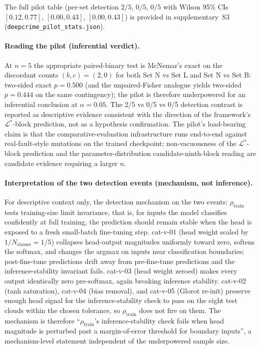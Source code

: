 \documentclass[manuscript]{acmart}
\begin{document}
The full pilot table (per-set detection $2/5$, $0/5$, $0/5$ with Wilson 95\% CIs $[0.12,0.77]$, $[0.00,0.43]$, $[0.00,0.43]$) is provided in supplementary~S3 (\texttt{deepcrime\_pilot\_stats.json}).

\paragraph{Reading the pilot (inferential verdict).}
At $n=5$ the appropriate paired-binary test is McNemar's exact on the discordant counts $(b, c) = (2, 0)$ for both Set N vs Set L and Set N vs Set B: two-sided exact $p = 0.500$ (and the unpaired-Fisher analogue yields two-sided $p = 0.444$ on the same contingency); the pilot is therefore underpowered for an inferential conclusion at $\alpha = 0.05$. The 2/5 vs 0/5 vs 0/5 detection contrast is reported as descriptive evidence consistent with the direction of the framework's $\mathcal{L}^{*}$-block prediction, not as a hypothesis confirmation. The pilot's load-bearing claim is that the comparative-evaluation infrastructure runs end-to-end against real-fault-style mutations on the trained checkpoint; non-vacuousness of the $\mathcal{L}^{*}$-block prediction and the parameter-distribution candidate-ninth-block reading are candidate evidence requiring a larger $n$.

\paragraph{Interpretation of the two detection events (mechanism, not inference).}
For descriptive context only, the detection mechanism on the two events: $\rho_{\mathrm{train}}$ tests training-size limit invariance, that is, for inputs the model classifies confidently at full training, the prediction should remain stable when the head is exposed to a fresh small-batch fine-tuning step. cat-v-01 (head weight scaled by $1/N_{\mathrm{classes}}=1/5$) collapses head-output magnitudes uniformly toward zero, softens the softmax, and changes the argmax on inputs near classification boundaries; post-fine-tune predictions drift away from pre-fine-tune predictions and the inference-stability invariant fails. cat-v-03 (head weight zeroed) makes every output identically zero pre-softmax, again breaking inference stability. cat-v-02 (tanh saturation), cat-v-04 (bias removal), and cat-v-05 (Glorot re-init) preserve enough head signal for the inference-stability check to pass on the eight test clouds within the chosen tolerance, so $\rho_{\mathrm{train}}$ does not fire on them. The mechanism is therefore ``$\rho_{\mathrm{train}}$'s inference-stability check fails when head magnitude is perturbed past a margin-of-error threshold for boundary inputs'', a mechanism-level statement independent of the underpowered sample size.
\end{document}
